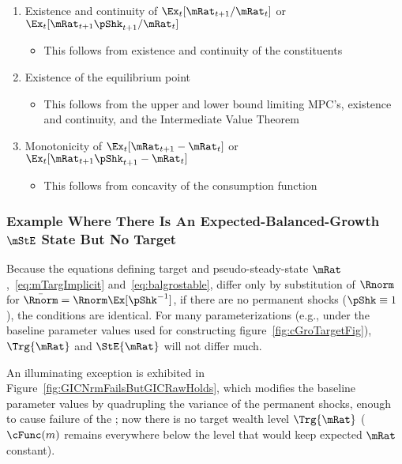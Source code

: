 \documentclass[BufferStockTheory]{subfiles}
\begin{document}
\begin{enumerate}
\item Existence and continuity of $\Ex_{t}[\mRat_{t+1}/\mRat_{t}]$ or $\Ex_{t}[\mRat_{t+1}\pShk_{t+1}/\mRat_{t}]$
  \begin{itemize}
    \item This follows from existence and continuity of the constituents
    \end{itemize}
  \item Existence of the equilibrium point
    \begin{itemize}
    \item This follows from the upper and lower bound limiting MPC's, existence and continuity, and the Intermediate Value Theorem
    \end{itemize}
  \item Monotonicity of $\Ex_{t}[{\mRat}_{t+1}-\mRat_{t}]$ or $\Ex_{t}[{\mRat}_{t+1}\pShk_{t+1}-\mRat_{t}]$
    \begin{itemize}
    \item This follows from concavity of the consumption function
    \end{itemize}
\end{enumerate}

\subsubsection{Example Where There Is An Expected-Balanced-Growth
  \texorpdfstring{$\mStE$}{m} State But No Target}

Because the equations defining target and pseudo-steady-state $\mRat$,~\eqref{eq:mTargImplicit} and~\eqref{eq:balgrostable}, differ only by substitution of $\Rnorm$ for $\bar{\Rnorm}=\Rnorm \Ex[\pShk^{-1}]$, if there are no permanent shocks ($\pShk \equiv 1$), the conditions are identical.  For many parameterizations (e.g., under the baseline parameter values used for constructing figure~\ref{fig:cGroTargetFig}), $\Trg{\mRat}$ and $\StE{\mRat}$ will not differ much.

An illuminating exception is exhibited in Figure~\ref{fig:GICNrmFailsButGICRawHolds}, which modifies the baseline parameter values by quadrupling the variance of the permanent shocks, enough to cause failure of the \GICNrm; now there is no target wealth level $\Trg{\mRat}$ ($\cFunc(m)$ remains everywhere below the level that would keep expected $\mRat$ constant).


\renewcommand{\figFile}{GICNrmFailsButGICRawHolds}
\hypertarget{\figFile}{}

\end{document}
